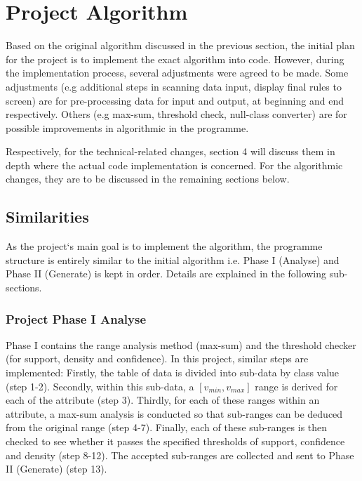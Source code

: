 \chapter{Project Algorithm}

Based on the original algorithm discussed in the previous section, the initial plan for the project is to implement the exact algorithm into code. However, during the implementation process, several adjustments were agreed to be made. Some adjustments (e.g additional steps in scanning data input, display final rules to screen) are for pre-processing data for input and output, at beginning and end respectively. Others (e.g max-sum, threshold check, null-class converter) are for possible improvements in algorithmic in the programme. 

Respectively, for the technical-related changes, section 4 will discuss them in depth where the actual code implementation is concerned. For the algorithmic changes, they are to be discussed in the remaining sections below.

\section{Similarities}

As the project`s main goal is to implement the algorithm, the programme structure is entirely similar to the initial algorithm i.e. Phase I (Analyse) and Phase II (Generate) is kept in order. Details are explained in the following sub-sections. \\


\subsection{Project Phase I Analyse}

Phase I contains the range analysis method (max-sum) and the threshold checker (for support, density and confidence). In this project, similar steps are implemented: Firstly, the table of data is divided into sub-data by class value (step 1-2). Secondly, within this sub-data, a $[v_{min}, v_{max}]$ range is derived for each of the attribute (step 3). Thirdly, for each of these ranges within an attribute, a max-sum analysis is conducted so that sub-ranges can be deduced from the original range (step 4-7). Finally, each of these sub-ranges is then checked to see whether it passes the specified thresholds of support, confidence and density (step 8-12). The accepted sub-ranges are collected and sent to Phase II (Generate) (step 13).

